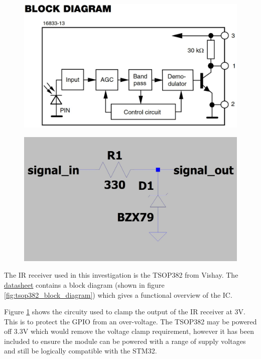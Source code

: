 \begin{figure}[H]
	\centering
	\begin{minipage}{.5\textwidth}
		\centering
		\includegraphics[width=.8\linewidth]{figures/design/TSOP382_block_diagram}
		\label{fig:tsop382_block_diagram}
	\end{minipage}%
	\begin{minipage}{.5\textwidth}
		\centering
		\includegraphics[width=.8\linewidth]{figures/design/over_voltage_protection}
		\label{fig:schematic_voltage_clamp}
	\end{minipage}
\end{figure}

The IR receiver used in this investigation is the TSOP382 from Vishay. The \href{https://www.vishay.com/docs/82491/tsop382.pdf}{datasheet} contains a block diagram (shown in figure \ref{fig:tsop382_block_diagram}) which gives a functional overview of the IC.

Figure \ref{fig:schematic_voltage_clamp} shows the circuity used to clamp the output of the IR receiver at 3V. This is to protect the GPIO from an over-voltage. The TSOP382 may be powered off 3.3V which would remove the voltage clamp requirement, however it has been included to ensure the module can be powered with a range of supply voltages and still be logically compatible with the STM32.

